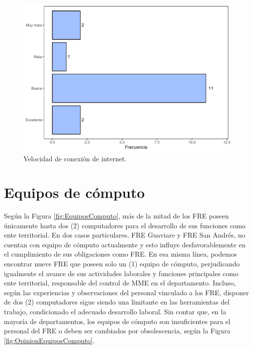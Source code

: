 \documentclass[
]{book}
\begin{document}
\begin{figure}[b!]

{\centering \includegraphics[width=0.85\linewidth]{InformeFinal_files/figure-latex/ConexionInternet-1} 

}

\caption{Velocidad de conexión de internet.}\label{fig:ConexionInternet}
\end{figure}

\hypertarget{equipos-de-cuxf3mputo}{%
\section{Equipos de cómputo}\label{equipos-de-cuxf3mputo}}

Según la Figura \ref{fig:EquiposComputo}, más de la mitad de los FRE poseen únicamente hasta dos (2) computadores para el desarrollo de sus funciones como ente territorial. En dos casos particulares, FRE Guaviare y FRE San Andrés, no cuentan con equipo de cómputo actualmente y esto influye desfavorablemente en el cumplimiento de sus obligaciones como FRE. En esa misma línea, podemos encontrar nueve FRE que poseen solo un (1) equipo de cómputo, perjudicando igualmente el avance de sus actividades laborales y funciones principales como ente territorial, responsable del control de MME en el departamento. Incluso, según las experiencias y observaciones del personal vinculado a los FRE, disponer de dos (2) computadores sigue siendo una limitante en las herramientas del trabajo, condicionado el adecuado desarrollo laboral. Sin contar que, en la mayoría de departamentos, los equipos de cómputo son insuficientes para el personal del FRE o deben ser cambiados por obsolescencia, según la Figura \ref{fig:OpinionEquiposComputo}.
\end{document}
